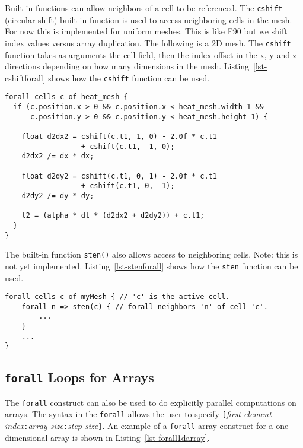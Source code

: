 Built-in functions can allow neighbors of a cell to be referenced.  The \texttt{cshift} 
(circular shift) built-in function is used to access neighboring cells in the mesh.
For now this is implemented for uniform meshes.  This is like F90 but we shift index values 
versus array duplication.  The following is a 2D mesh.  The \texttt{cshift}  function
takes as arguments the cell field, then the index offset in the x, y and z directions depending
on how many dimensions in the mesh.  Listing~\ref{lst-cshiftforall} shows how the \texttt{cshift}
function can be used.

\par\bigskip
\begin{lstlisting}[float=h,label=lst-cshiftforall,
	caption={\texttt{forall} loop construct with use of cshift.}]
forall cells c of heat_mesh {
  if (c.position.x > 0 && c.position.x < heat_mesh.width-1 &&
      c.position.y > 0 && c.position.y < heat_mesh.height-1) {

    float d2dx2 = cshift(c.t1, 1, 0) - 2.0f * c.t1 
                  + cshift(c.t1, -1, 0);
    d2dx2 /= dx * dx;

    float d2dy2 = cshift(c.t1, 0, 1) - 2.0f * c.t1 
                  + cshift(c.t1, 0, -1);
    d2dy2 /= dy * dy;

    t2 = (alpha * dt * (d2dx2 + d2dy2)) + c.t1;
  }
}
\end{lstlisting}
\par\bigskip\noindent

The built-in function \texttt{sten()} also allows access to neighboring cells.  Note:  this is not yet 
implemented.  Listing~\ref{lst-stenforall} shows how the \texttt{sten} function can be used.

\par\bigskip
\begin{lstlisting}[float=h,label=lst-stenforall,
	caption={Nested \texttt{forall} loop construct with selection of neighboring cells.}]
forall cells c of myMesh { // 'c' is the active cell.
	forall n => sten(c) { // forall neighbors 'n' of cell 'c'.
		...
	}
	...
}
\end{lstlisting}
\par\bigskip\noindent

\subsection{\texttt{forall} Loops for Arrays}

The \texttt{forall} construct can also be used to do explicitly parallel computations
on arrays.  The syntax in the \texttt{forall} allows the user to specify
\texttt{[}\textit{first-element-index}\texttt{:}\textit{array-size}\texttt{:}\textit{step-size}\texttt{]}.
An example of a \texttt{forall} array construct for a one-dimensional array is shown in 
Listing~\ref{lst-forall1darray}.

